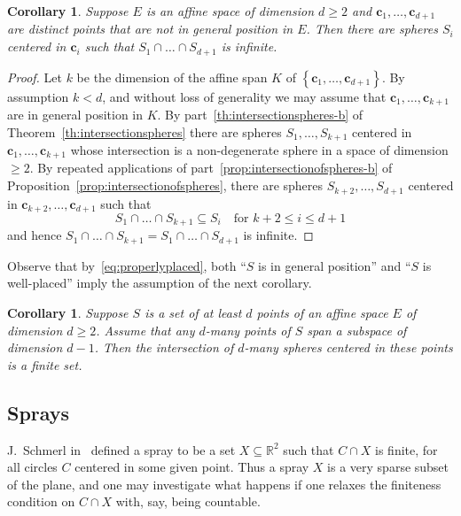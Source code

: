 \documentclass[12pt]{amsart}
\newcommand{\R}{\mathbb{R}}	%
\newcommand{\setLR}[1]{\left \{ {#1} \right \}} %
\theoremstyle{plain}
\newtheorem{corollary}[theorem]{Corollary}
\theoremstyle{definition}
\theoremstyle{remark}
\begin{document}
\begin{corollary}\label{cor:intersectionspheres-1}
Suppose \( E \) is an affine space of dimension \( d \geq 2 \) and \( \mathbf{c}_1 , \dots , \mathbf{c}_{ d + 1} \) are distinct points that are not in general position in \( E \).
Then there are spheres \( S_i \) centered in \( \mathbf{c}_i \) such that \( S_1 \cap \dots \cap S_{ d + 1} \) is infinite.
\end{corollary}

\begin{proof}
Let \( k \) be the dimension of the affine span \( K \) of \( \setLR{ \mathbf{c}_1 , \dots , \mathbf{c}_{ d + 1 } } \).
By assumption \( k < d \), and without loss of generality we may assume that \( \mathbf{c}_1 , \dots , \mathbf{c}_{k + 1} \) are in general position in \( K \).
By part~\ref{th:intersectionspheres-b} of Theorem~\ref{th:intersectionspheres} there are spheres \( S_1 , \dots , S_{ k + 1 } \) centered in \( \mathbf{c}_1 , \dots , \mathbf{c}_{ k + 1 } \) whose intersection is a non-degenerate sphere in a space of dimension \( \geq 2 \).
By repeated applications of part~\ref{prop:intersectionofspheres-b} of Proposition~\ref{prop:intersectionofspheres}, there are spheres \( S_{ k + 2 }, \dots , S_{ d + 1 } \) centered in \( \mathbf{c}_{ k + 2 } , \dots , \mathbf{c}_{ d + 1 } \) such that 
\[
 S_1 \cap \dots \cap S_{ k + 1 } \subseteq S_i \quad \text{for } k + 2 \leq i \leq d + 1
\]
and hence \( S_1 \cap \dots \cap S_{ k + 1 } = S_1 \cap \dots \cap S_{ d + 1 } \) is infinite.
\end{proof}

Observe that by~\eqref{eq:properlyplaced}, both ``\( S \) is in general position'' and ``\( S \) is well-placed'' imply the assumption of the next corollary.

\begin{corollary}\label{cor:intersectionspheres-2}
Suppose \( S \) is a set of at least \( d \) points of an affine space \( E \) of dimension \( d \geq 2 \).
Assume that any \( d \)-many points of \( S \) span a subspace of dimension \( d - 1 \).
Then the intersection of \( d \)-many spheres centered in these points is a finite set.
\end{corollary}

\subsection{Sprays}\label{subsec:sprays}
J.~Schmerl in~\cite{Schmerl:2003uq} defined a spray to be a set \( X \subseteq \R^2 \) such that \( C \cap X \) is finite, for all circles \( C \) centered in some given point.
Thus a spray \( X \) is a very sparse subset of the plane, and one may investigate what happens if one relaxes the finiteness condition on \( C \cap X \) with, say, being countable.
\end{document}
